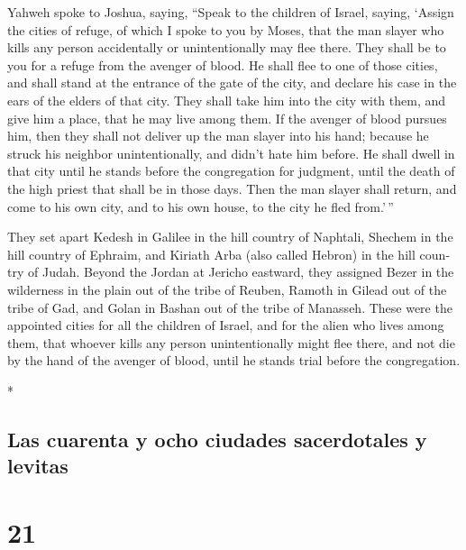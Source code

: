 \begin{paracol}{2}
\begin{otherlanguage}{english}
 Yahweh spoke to Joshua, saying,  ``Speak to
the children of Israel, saying, `Assign the cities of refuge, of which I
spoke to you by Moses,  that the man slayer who kills any
person accidentally or unintentionally may flee there. They shall be to
you for a refuge from the avenger of blood.  He shall flee
to one of those cities, and shall stand at the entrance of the gate of
the city, and declare his case in the ears of the elders of that city.
They shall take him into the city with them, and give him a place, that
he may live among them.  If the avenger of blood pursues
him, then they shall not deliver up the man slayer into his hand;
because he struck his neighbor unintentionally, and didn't hate him
before.  He shall dwell in that city until he stands
before the congregation for judgment, until the death of the high priest
that shall be in those days. Then the man slayer shall return, and come
to his own city, and to his own house, to the city he fled from.'\,''

 They set apart Kedesh in Galilee in the hill country of
Naphtali, Shechem in the hill country of Ephraim, and Kiriath Arba (also
called Hebron) in the hill country of Judah.  Beyond the
Jordan at Jericho eastward, they assigned Bezer in the wilderness in the
plain out of the tribe of Reuben, Ramoth in Gilead out of the tribe of
Gad, and Golan in Bashan out of the tribe of Manasseh. 
These were the appointed cities for all the children of Israel, and for
the alien who lives among them, that whoever kills any person
unintentionally might flee there, and not die by the hand of the avenger
of blood, until he stands trial before the congregation.

\end{otherlanguage}

\switchcolumn[0]*

\hypertarget{las-cuarenta-y-ocho-ciudades-sacerdotales-y-levitas}{%
\subsection{Las cuarenta y ocho ciudades sacerdotales y
levitas}\label{las-cuarenta-y-ocho-ciudades-sacerdotales-y-levitas}}

\hypertarget{section-40}{%
\section{21}\label{section-40}}


\end{paracol}
